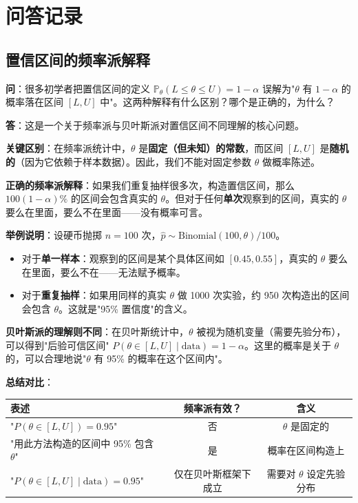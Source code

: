 \section{问答记录}

\subsection{置信区间的频率派解释}\label{sec:qa-confidence-interval-frequentist}

\textbf{问}：很多初学者把置信区间的定义 $\mathbb{P}_\theta(L \leq \theta \leq U) = 1 - \alpha$ 误解为"$\theta$ 有 $1-\alpha$ 的概率落在区间 $[L, U]$ 中"。这两种解释有什么区别？哪个是正确的，为什么？

\textbf{答}：这是一个关于频率派与贝叶斯派对置信区间不同理解的核心问题。

\textbf{关键区别}：在频率派统计中，$\theta$ 是\textbf{固定（但未知）的常数}，而区间 $[L, U]$ 是\textbf{随机的}（因为它依赖于样本数据）。因此，我们不能对固定参数 $\theta$ 做概率陈述。

\textbf{正确的频率派解释}：如果我们重复抽样很多次，构造置信区间，那么 $100(1-\alpha)\%$ 的区间会包含真实的 $\theta$。但对于任何\textbf{单次}观察到的区间，真实的 $\theta$ 要么在里面，要么不在里面——没有概率可言。

\textbf{举例说明}：设硬币抛掷 $n=100$ 次，$\hat{p} \sim \text{Binomial}(100, \theta)/100$。
\begin{itemize}
\item 对于\textbf{单一样本}：观察到的区间是某个具体区间如 $[0.45, 0.55]$，真实的 $\theta$ 要么在里面，要么不在——无法赋予概率。
\item 对于\textbf{重复抽样}：如果用同样的真实 $\theta$ 做 1000 次实验，约 950 次构造出的区间会包含 $\theta$。这就是"95\% 置信度"的含义。
\end{itemize}

\textbf{贝叶斯派的理解则不同}：在贝叶斯统计中，$\theta$ 被视为随机变量（需要先验分布），可以得到"后验可信区间" $P(\theta \in [L, U] \mid \text{data}) = 1 - \alpha$。这里的概率是关于 $\theta$ 的，可以合理地说"$\theta$ 有 95\% 的概率在这个区间内"。

\textbf{总结对比}：
\begin{center}
\begin{tabular}{lcc}
\hline
表述 & 频率派有效？ & 含义 \\
\hline
"$P(\theta \in [L,U]) = 0.95$" & 否 & $\theta$ 是固定的 \\
"用此方法构造的区间中 95\% 包含 $\theta$" & 是 & 概率在区间构造上 \\
"$P(\theta \in [L,U] \mid \text{data}) = 0.95$" & 仅在贝叶斯框架下成立 & 需要对 $\theta$ 设定先验分布 \\
\hline
\end{tabular}
\end{center}

